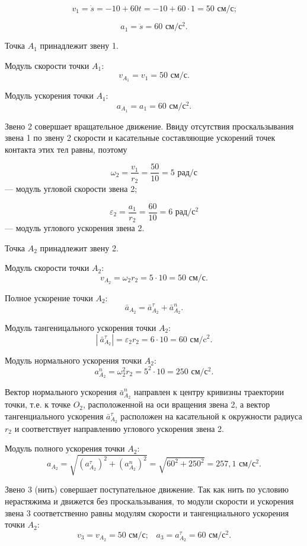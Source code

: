 \documentclass{article}
\begin{document}
$$v_1=\dot{s}= -10 + 60t = -10 + 60\cdot 1 = 50 \text{ см/с;}$$

$$a_1=\ddot{s}=60 \text{ см/с$^2$.}$$

\medskip

Точка $A_1$ принадлежит звену 1.

Модуль скорости точки $A_1$:
$$v_{A_1}=v_1=50\text{ см/с.}$$

Модуль ускорения точки $A_1$:
$$a_{A_1}=a_1=60\text{ см/с$^2$.}$$

Звено 2 совершает вращательное движение. Ввиду отсутствия проскальзывания звена 1
по звену 2 скорости и касательные составляющие ускорений точек контакта этих тел равны, поэтому

$$\omega_2=\frac{v_1}{r_2}=\frac{50}{10}=5\text{ рад/с}$$
\noindent--- модуль угловой скорости звена 2;

$$\varepsilon_2=\frac{a_1}{r_2}=\frac{60}{10}=6\text{ рад/с$^2$}$$
\noindent--- модуль углового ускорения звена 2.

\medskip

Точка $A_2$ принадлежит звену 2.

Модуль скорости точки $A_2$:
$$v_{A_2}= \omega_2 r_2 = 5 \cdot 10 = 50\text{ см/с.}$$

Полное ускорение точки $A_2$:
$$\bar{a}_{A_2}=\bar{a}_{A_2}^\tau+\bar{a}_{A_2}^n\text{.}$$

\newpage

Модуль тангеницального ускорения точки $A_2$:
$$\left|\:\bar{a}_{A_2}^\tau\right| = \varepsilon_2 r_2 = 6 \cdot 10 = 60\text{ см/c$^2$.}$$

Модуль нормального ускорения точки $A_2$:
$$a_{A_2}^n=\omega_2^2 r_2 = 5^2 \cdot 10 = 250\text{ см/с$^2$.}$$

Вектор нормального ускорения $\bar{a}_{A_2}^n$ направлен к центру кривизны траектории точки, т.е. к точке $O_2$, расположенной на оси вращения звена 2, а вектор тангенциального ускорения $\bar{a}_{A_2}^\tau$ расположен на касательной к окружности радиуса $r_2$ и соответствует направлению  углового ускорения звена 2. 

Модуль полного ускорения точки $A_2$:
$$a_{A_2}=\sqrt{(a_{A_2}^\tau)^2+(a_{A_2}^n)^2}=\sqrt{60^2+250^2}=257,1\text{ см/с$^2$.}$$

Звено 3 (нить) совершает поступательное движение. Так как нить по условию нерастяжима и движется без проскальзывания, то модули скорости и ускорения звена 3 соответственно равны модулям скорости и тангенциального ускорения точки $A_2$:
$$v_3 = v_{A_2} = 50 \text{ см/с;} \quad a_3 = a_{A_2}^\tau = 60 \text{ см/с$^2$.}$$
\end{document}
